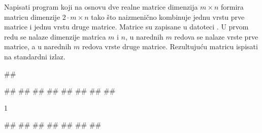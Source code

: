 \begin{Exercise}[label=2_23]
Napisati program koji na osnovu dve realne matrice dimenzija $m \times n$
formira matricu dimenzije $2 \cdot m \times n$ tako što
naizmenično kombinuje jednu vrstu prve matrice i jednu vrstu
druge matrice. Matrice su zapisane u datoteci . U
prvom redu se nalaze dimenzije matrica $m$ i $n$, u
narednih $m$ redova se nalaze vrste prve matrice, a u
narednih $m$ redova vrste druge matrice. Rezultujuću
matricu ispisati na standardni izlaz.


\begin{miditest}
\begin{upotreba}{1}
##

##
##
##
##
##
##
##
##
\end{upotreba}
\end{miditest}
\begin{miditest}
\begin{test2}{1}



#\naslovInt#
##
##
##
##
##
##
\end{test2}
\end{miditest}
\end{Exercise}

